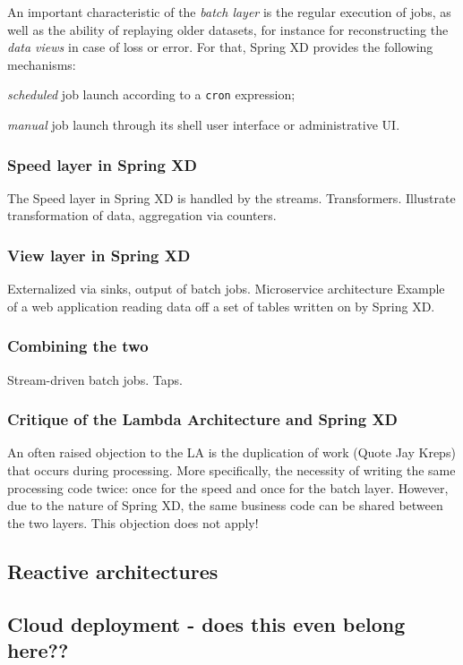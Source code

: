 An important characteristic of the \emph{batch layer} is the regular execution of jobs, as well as the ability of replaying older datasets, for instance for reconstructing the \emph{data views} in case of loss or error. For that, Spring XD provides the following mechanisms:

\begin{itemize*}
\item \emph{scheduled} job launch according to a \texttt{cron} expression;
\item \emph{manual} job launch through its shell user interface or administrative UI.
\end{itemize*}

\subsubsection {Speed layer in Spring XD}

The Speed layer in Spring XD is handled by the streams. Transformers. Illustrate transformation of data, aggregation via counters.  

\subsubsection {View layer in Spring XD}

Externalized via sinks, output of batch jobs. Microservice architecture Example of a web application reading data off a set of tables 
written on by Spring XD. 

\subsubsection {Combining the two}

Stream-driven batch jobs. Taps. 


\subsubsection {Critique of the Lambda Architecture and Spring XD}

An often raised objection to the LA is the duplication of work (Quote Jay Kreps) that occurs during processing. More specifically, the necessity of writing the same processing code twice: once for the speed and once for the batch layer. However, due to the nature of Spring XD, the same business code can be shared between the two layers. This objection does not apply!


\subsection {Reactive architectures}

\subsection {Cloud deployment - does this even belong here??}
